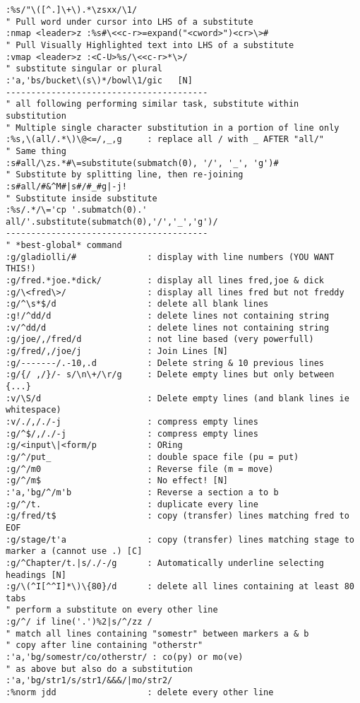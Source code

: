 \documentclass[10pt,landscape]{article}
\begin{document}
\begin{multicols}{2}
\begin{verbatim}
:%s/"\([^.]\+\).*\zsxx/\1/
" Pull word under cursor into LHS of a substitute
:nmap <leader>z :%s#\<<c-r>=expand("<cword>")<cr>\>#
" Pull Visually Highlighted text into LHS of a substitute
:vmap <leader>z :<C-U>%s/\<<c-r>*\>/
" substitute singular or plural
:'a,'bs/bucket\(s\)*/bowl\1/gic   [N]
----------------------------------------
" all following performing similar task, substitute within substitution
" Multiple single character substitution in a portion of line only
:%s,\(all/.*\)\@<=/,_,g     : replace all / with _ AFTER "all/"
" Same thing
:s#all/\zs.*#\=substitute(submatch(0), '/', '_', 'g')#
" Substitute by splitting line, then re-joining
:s#all/#&^M#|s#/#_#g|-j!
" Substitute inside substitute
:%s/.*/\='cp '.submatch(0).' all/'.substitute(submatch(0),'/','_','g')/
----------------------------------------
" *best-global* command 
:g/gladiolli/#              : display with line numbers (YOU WANT THIS!)
:g/fred.*joe.*dick/         : display all lines fred,joe & dick
:g/\<fred\>/                : display all lines fred but not freddy
:g/^\s*$/d                  : delete all blank lines
:g!/^dd/d                   : delete lines not containing string
:v/^dd/d                    : delete lines not containing string
:g/joe/,/fred/d             : not line based (very powerfull)
:g/fred/,/joe/j             : Join Lines [N]
:g/-------/.-10,.d          : Delete string & 10 previous lines
:g/{/ ,/}/- s/\n\+/\r/g     : Delete empty lines but only between {...}
:v/\S/d                     : Delete empty lines (and blank lines ie whitespace)
:v/./,/./-j                 : compress empty lines
:g/^$/,/./-j                : compress empty lines
:g/<input\|<form/p          : ORing
:g/^/put_                   : double space file (pu = put)
:g/^/m0                     : Reverse file (m = move)
:g/^/m$                     : No effect! [N]
:'a,'bg/^/m'b               : Reverse a section a to b
:g/^/t.                     : duplicate every line
:g/fred/t$                  : copy (transfer) lines matching fred to EOF
:g/stage/t'a                : copy (transfer) lines matching stage to marker a (cannot use .) [C]
:g/^Chapter/t.|s/./-/g      : Automatically underline selecting headings [N]
:g/\(^I[^^I]*\)\{80}/d      : delete all lines containing at least 80 tabs
" perform a substitute on every other line
:g/^/ if line('.')%2|s/^/zz / 
" match all lines containing "somestr" between markers a & b
" copy after line containing "otherstr"
:'a,'bg/somestr/co/otherstr/ : co(py) or mo(ve)
" as above but also do a substitution
:'a,'bg/str1/s/str1/&&&/|mo/str2/
:%norm jdd                  : delete every other line

\end{verbatim}
\end{multicols}
\end{document}
